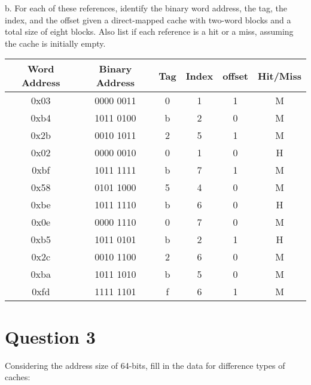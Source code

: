 \documentclass{article}
\begin{document}
b. For each of these references, identify the binary word address, the tag, the
index, and the offset given a direct-mapped cache with two-word blocks and a total size of
eight blocks. Also list if each reference is a hit or a miss, assuming the cache is initially
empty.

\begin{table}[h]
    \centering
    \begin{tabular}{|c|c|c|c|c|c|}
        \hline
        \rowcolor[gray]{0.8}
        Word Address & Binary Address  & Tag  & Index & offset & Hit/Miss\\
        \hline
        0x03 & 0000 0011 & 0 & 1 & 1 & M\\
        \hline
        0xb4 & 1011 0100 & b & 2 & 0 & M\\
        \hline
        0x2b & 0010 1011 & 2 & 5 & 1 & M\\
        \hline
        0x02 & 0000 0010 & 0 & 1 & 0 & H\\
        \hline
        0xbf & 1011 1111 & b & 7 & 1 & M\\
        \hline
        0x58 & 0101 1000 & 5 & 4 & 0 & M\\
        \hline
        0xbe & 1011 1110 & b & 6 & 0 & H\\
        \hline
        0x0e & 0000 1110 & 0 & 7 & 0 & M\\
        \hline
        0xb5 & 1011 0101 & b & 2 & 1 & H\\
        \hline
        0x2c & 0010 1100 & 2 & 6 & 0 & M\\
        \hline
        0xba & 1011 1010 & b & 5 & 0 & M\\
        \hline
        0xfd & 1111 1101 & f & 6 & 1 & M\\
        \hline
    \end{tabular}
    \label{tab:mytable}
\end{table}

\section*{Question 3}

Considering the address size of 64-bits, fill in the data for difference types of caches:
\end{document}
